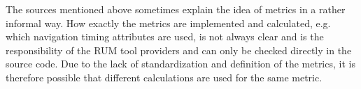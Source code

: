 The sources mentioned above sometimes explain the idea of metrics in a rather informal way.
How exactly the metrics are implemented and calculated, e.g. which navigation timing attributes are used, is not always clear and is the responsibility of the RUM tool providers and can only be checked directly in the source code.
Due to the lack of standardization and definition of the metrics, it is therefore possible that different calculations are used for the same metric.



